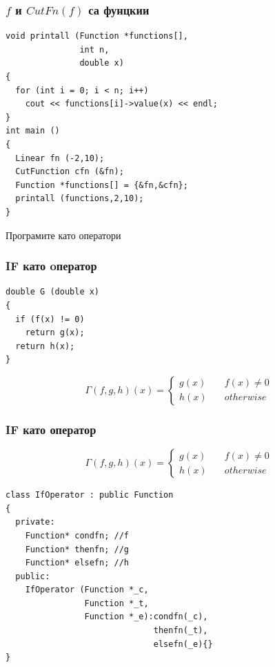 \documentclass{beamer}
\begin{document}
\begin{frame}[fragile]
\frametitle{$f$ и $CutFn(f)$ са фунцкии}


\begin{flushleft}
\begin{lstlisting}
void printall (Function *functions[],
               int n,
               double x)
{
  for (int i = 0; i < n; i++)
    cout << functions[i]->value(x) << endl;
}
int main ()
{
  Linear fn (-2,10);
  CutFunction cfn (&fn);
  Function *functions[] = {&fn,&cfn};
  printall (functions,2,10);
}
\end{lstlisting}

\end{flushleft}
\end{frame}


\begin{frame}
\centerline{Програмите като оператори}
\end{frame}


\begin{frame}[fragile]
\frametitle{IF като oператор}

\begin{center}

\begin{lstlisting}
double G (double x)
{
  if (f(x) != 0)
    return g(x);
  return h(x);
}
\end{lstlisting}

\end{center}


$$
\Gamma(f,g,h)(x) = \left\{
        \begin{array}{ll}
            g(x) & \quad f(x) \neq 0 \\
            h(x) & \quad otherwise
        \end{array}
    \right.
$$



\end{frame}




\begin{frame}[fragile]
\frametitle{IF като оператор}

\begin{center}
$$
\Gamma(f,g,h)(x) = \left\{
        \begin{array}{ll}
            g(x) & \quad f(x) \neq 0 \\
            h(x) & \quad otherwise
        \end{array}
    \right.
$$


\begin{lstlisting}
class IfOperator : public Function
{
  private:
    Function* condfn; //f
    Function* thenfn; //g
    Function* elsefn; //h
  public:
    IfOperator (Function *_c,
                Function *_t,
                Function *_e):condfn(_c),
                              thenfn(_t),
                              elsefn(_e){}
}
\end{lstlisting}

\end{center}


\end{frame}
\end{document}
